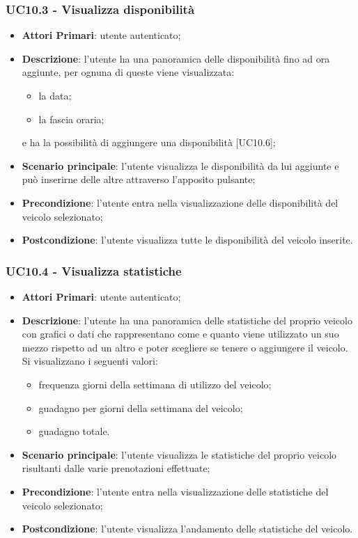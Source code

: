 \subsubsection{UC10.3 - Visualizza disponibilità}
\begin{itemize}
	\item \textbf{Attori Primari}: utente autenticato;
	\item \textbf{Descrizione}: l'utente ha una panoramica delle disponibilità fino ad ora aggiunte, per ognuna di queste viene visualizzata:
	\begin{itemize}
		\item la data;
		\item la fascia oraria;
	\end{itemize} 
	e ha la possibilità di aggiungere una disponibilità [UC10.6];
	\item \textbf{Scenario principale}: l'utente visualizza le disponibilità da lui aggiunte e può inserirne delle altre attraverso l'apposito pulsante;
	\item \textbf{Precondizione}: l'utente entra nella visualizzazione delle disponibilità del veicolo selezionato;
	\item \textbf{Postcondizione}: l'utente visualizza tutte le disponibilità del veicolo inserite. 
\end{itemize}
\subsubsection{UC10.4 - Visualizza statistiche}
\begin{itemize}
	\item \textbf{Attori Primari}: utente autenticato;
	\item \textbf{Descrizione}: l'utente ha una panoramica delle statistiche del proprio veicolo con grafici o dati che rappresentano come e quanto viene utilizzato un suo mezzo rispetto ad un altro e poter scegliere se tenere o aggiungere il veicolo. Si visualizzano i seguenti valori:
	\begin{itemize}
		\item frequenza giorni della settimana di utilizzo del veicolo;
		\item guadagno per giorni della settimana del veicolo;
		\item guadagno totale.
	\end{itemize}
	\item \textbf{Scenario principale}: l'utente visualizza le statistiche del proprio veicolo risultanti dalle varie prenotazioni effettuate;
	\item \textbf{Precondizione}: l'utente entra nella visualizzazione delle statistiche del veicolo selezionato;
	\item \textbf{Postcondizione}: l'utente visualizza l'andamento delle statistiche del veicolo. 
\end{itemize}
